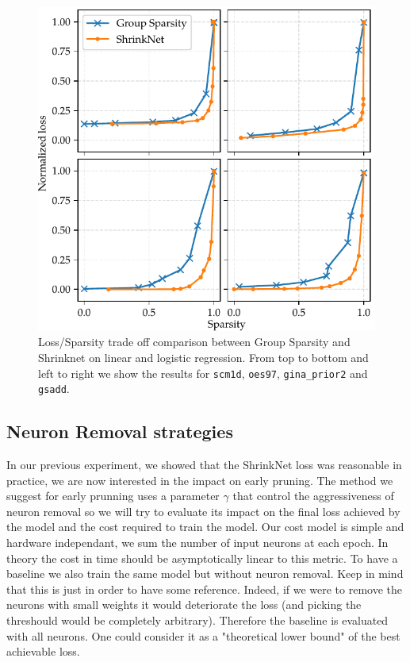 \begin{figure}
\begin{center}
\includegraphics[width=\columnwidth]{regressions}
\vspace*{-5mm}
\caption{\label{sparsity_accuracy}Loss/Sparsity trade off comparison between Group Sparsity and Shrinknet on linear and logistic regression. From top to bottom and left to right we show the results for \texttt{scm1d}, \texttt{oes97}, \texttt{gina\_prior2} and \texttt{gsadd}.}

\end{center}
\vspace*{-4mm}
\end{figure}

\subsection{Neuron Removal strategies}

In our previous experiment, we showed that the ShrinkNet loss was
reasonable in practice, we are now interested in the impact on
early pruning. The method we suggest for early prunning uses a
parameter $\gamma$ that control the aggressiveness of neuron removal
so we will try to evaluate its impact on the final loss achieved by
the model and the cost required to train the model. Our cost model
is simple and hardware independant, we sum the number of input neurons
at each epoch. In theory the cost in time should be asymptotically
linear to this metric. To have a baseline we also train the same model
but without neuron removal. Keep in mind that this is just in order to
have some reference. Indeed, if we were to remove the neurons with small
weights it would deteriorate the loss (and picking the threshould would
be completely arbitrary). Therefore the baseline is evaluated with all neurons.
One could consider it as a "theoretical lower bound" of the best achievable loss.


